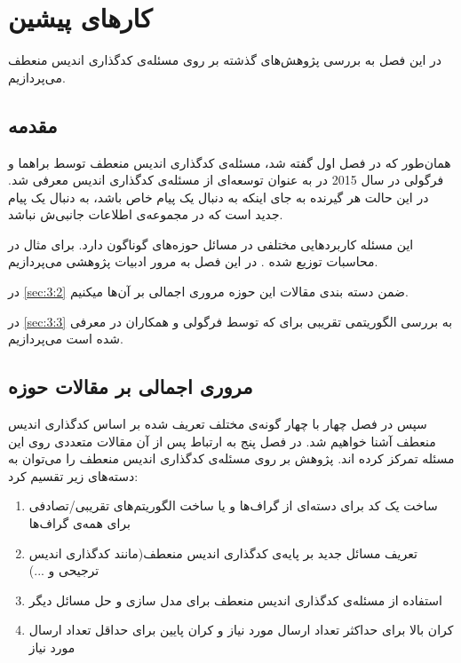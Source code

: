 \chapter{کارهای پیشین}
\label{chapter:literature}

در این فصل به بررسی پژوهش‌های گذشته بر روی مسئله‌ی کدگذاری اندیس منعطف می‌پردازیم.

\section{مقدمه}
همان‌طور که در فصل اول گفته شد، مسئله‌ی کدگذاری اندیس منعطف توسط براهما و فرگولی در سال 2015 در
\cite{pliablefirstpaper}
به عنوان توسعه‌ای از مسئله‌ی کدگذاری اندیس معرفی شد. در این حالت هر گیرنده به جای اینکه به دنبال یک پیام خاص باشد، به دنبال یک پیام جدید است که در مجموعه‌ی اطلاعات جانبی‌ش نباشد.

این مسئله کاربردهایی مختلفی در مسائل حوزه‌های گوناگون دارد. برای مثال در محاسبات توزیع شده
\cite{datashuf}
\cite{8404065}
\cite{8682270}.
در این فصل به مرور ادبیات پژوهشی 
\picod
می‌پردازیم.

در 
\autoref{sec:3:2}
ضمن دسته بندی مقالات این حوزه مروری اجمالی بر آن‌ها میکنیم.

در 
\autoref{sec:3:3}
به بررسی الگوریتمی تقریبی برای 
\picod
که توسط فرگولی و همکاران در
\cite{song2017polynomialtime}
معرفی شده است می‌پردازیم.
\section{
	مروری اجمالی بر مقالات حوزه
\picod
}
\label{sec:3:2}
سپس در فصل چهار با چهار گونه‌ی مختلف تعریف شده بر اساس کدگذاری اندیس منعطف آشنا خواهیم شد.
در فصل پنج به ارتباط
پس از آن مقالات متعددی روی این مسئله تمرکز کرده اند. پژوهش بر روی مسئله‌ی کدگذاری اندیس منعطف را می‌توان به دسته‌های زیر تقسیم کرد:
\begin{enumerate}
\item 
ساخت یک کد برای دسته‌ای از گراف‌ها و یا ساخت الگوریتم‌های تقریبی/تصادفی برای همه‌ی گراف‌ها
\item 
تعریف مسائل جدید بر پایه‌ی کدگذاری اندیس منعطف(مانند کدگذاری اندیس ترجیحی و ...)
\item 
استفاده از مسئله‌ی کدگذاری اندیس منعطف برای مدل سازی و حل مسائل دیگر
\item 
کران بالا برای حداکثر تعداد ارسال مورد نیاز و کران پایین برای حداقل تعداد ارسال مورد نیاز
\end{enumerate}

